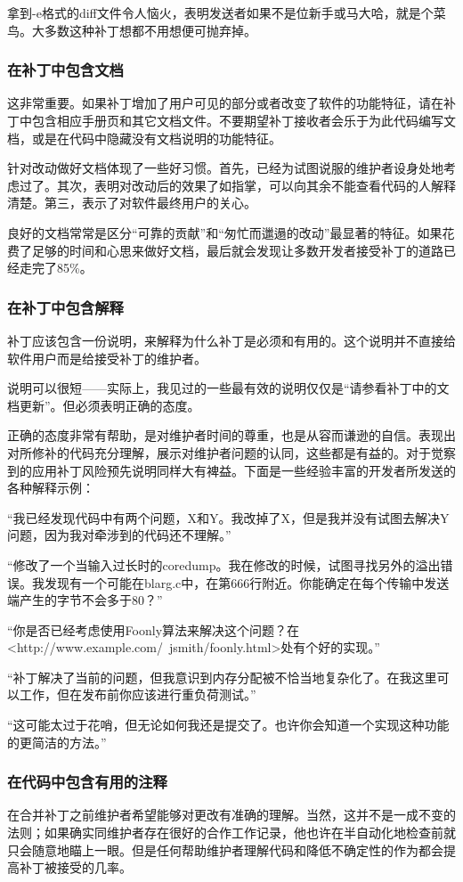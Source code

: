 \documentclass[12pt,oneside]{ctexbook}
\begin{document}
\begin{common-format}
拿到-e格式的diff文件令人恼火，表明发送者如果不是位新手或马大哈，就是个菜鸟。大多数这种补丁想都不用想便可抛弃掉。

\subsubsection{在补丁中包含文档}
这非常重要。如果补丁增加了用户可见的部分或者改变了软件的功能特征，请在补丁中包含相应手册页和其它文档文件。不要期望补丁接收者会乐于为此代码编写文档，或是在代码中隐藏没有文档说明的功能特征。

针对改动做好文档体现了一些好习惯。首先，已经为试图说服的维护者设身处地考虑过了。其次，表明对改动后的效果了如指掌，可以向其余不能查看代码的人解释清楚。第三，表示了对软件最终用户的关心。

良好的文档常常是区分“可靠的贡献”和“匆忙而邋遢的改动”最显著的特征。如果花费了足够的时间和心思来做好文档，最后就会发现让多数开发者接受补丁的道路已经走完了85\%{}。

\subsubsection{在补丁中包含解释}
补丁应该包含一份说明，来解释为什么补丁是必须和有用的。这个说明并不直接给软件用户而是给接受补丁的维护者。

说明可以很短——实际上，我见过的一些最有效的说明仅仅是“请参看补丁中的文档更新”。但必须表明正确的态度。

正确的态度非常有帮助，是对维护者时间的尊重，也是从容而谦逊的自信。表现出对所修补的代码充分理解，展示对维护者问题的认同，这些都是有益的。对于觉察到的应用补丁风险预先说明同样大有裨益。下面是一些经验丰富的开发者所发送的各种解释示例：

“我已经发现代码中有两个问题，X和Y。我改掉了X，但是我并没有试图去解决Y问题，因为我对牵涉到的代码还不理解。”

“修改了一个当输入过长时的coredump。我在修改的时候，试图寻找另外的溢出错误。我发现有一个可能在blarg.c中，在第666行附近。你能确定在每个传输中发送端产生的字节不会多于80？”

“你是否已经考虑使用Foonly算法来解决这个问题？在\\ <http://www.example.com/~jsmith/foonly.html>处有个好的实现。”

“补丁解决了当前的问题，但我意识到内存分配被不恰当地复杂化了。在我这里可以工作，但在发布前你应该进行重负荷测试。”

“这可能太过于花哨，但无论如何我还是提交了。也许你会知道一个实现这种功能的更简洁的方法。”

\subsubsection{在代码中包含有用的注释}
在合并补丁之前维护者希望能够对更改有准确的理解。当然，这并不是一成不变的法则；如果确实同维护者存在很好的合作工作记录，他也许在半自动化地检查前就只会随意地瞄上一眼。但是任何帮助维护者理解代码和降低不确定性的作为都会提高补丁被接受的几率。


\end{common-format}
\end{document}
